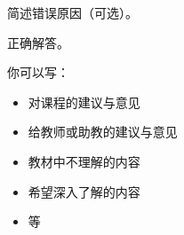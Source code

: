 \documentclass[11pt, a4paper, UTF8]{ctexart}
\begin{document}
\begin{cause}
  简述错误原因（可选）。
\end{cause}

\begin{revision}
  正确解答。
\end{revision}
\beginfb	%

你可以写：
\begin{itemize}
  \item 对课程的建议与意见
  \item 给教师或助教的建议与意见
  \item 教材中不理解的内容
  \item 希望深入了解的内容
  \item 等
\end{itemize}
\end{document}
